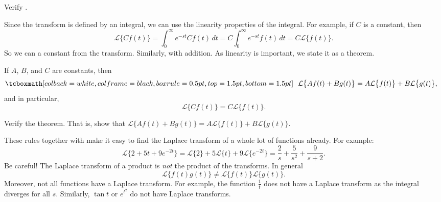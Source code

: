 \begin{exercise}
Verify .
\end{exercise}

Since the transform is defined by an integral, we can use the linearity
properties of the integral.  For example, if $C$ is a constant, then
\begin{equation*}
\mathcal{L} \bigl\{ C f(t) \bigr\} =
\int_0^\infty e^{-st} C f(t) \,dt =
C \int_0^\infty e^{-st} f(t) \,dt =
C \mathcal{L} \bigl\{ f(t) \bigr\} .
\end{equation*}
So we can  a constant from the transform.
Similarly, with addition.
As linearity is important, we state it as a theorem.

\begin{theorem}
If $A$, $B$, and $C$ are constants, then
\begin{equation*}
\mybxbg{~~
\mathcal{L} \bigl\{ A f(t) + B g(t) \bigr\} =
A \mathcal{L} \bigl\{ f(t) \bigr\} +
B \mathcal{L} \bigl\{ g(t) \bigr\} ,
~~}
\end{equation*}
and in particular,
\begin{equation*}
\mathcal{L} \bigl\{ C f(t) \bigr\} =
C \mathcal{L} \bigl\{ f(t) \bigr\} .
\end{equation*}
\end{theorem}

\begin{exercise}
Verify the theorem.  That is, show that
$\mathcal{L} \bigl\{ A f(t) + B g(t) \bigr\} =
A \mathcal{L} \bigl\{ f(t) \bigr\} +
B \mathcal{L} \bigl\{ g(t) \bigr\}$.
\end{exercise}

These rules together with  make it easy to find
the Laplace transform of a whole lot of functions already.
For example:
\begin{equation*}
\mathcal{L}\bigl\{
2 + 5t + 9e^{-2t}
\bigr\}
=
\mathcal{L}\bigl\{
2
\bigr\}
+5
\mathcal{L}\bigl\{
t
\bigr\}
+
9
\mathcal{L}\bigl\{
e^{-2t}
\bigr\}
=
\frac{2}{s} + \frac{5}{s^2} + \frac{9}{s+2} .
\end{equation*}
Be careful!
The Laplace transform of a product
is \emph{not} the product of the transforms.  In general 
\begin{equation*}
\mathcal{L} \bigl\{ f(t) g(t) \bigr\} \neq
\mathcal{L} \bigl\{ f(t) \bigr\}
\mathcal{L} \bigl\{ g(t) \bigr\} .
\end{equation*}
Moreover, not all functions have a Laplace transform.  For
example, the function $\frac{1}{t}$ does not have a Laplace transform as the
integral diverges for all $s$.  Similarly,
$\tan t$ or $e^{t^2}$ do not have Laplace transforms.

